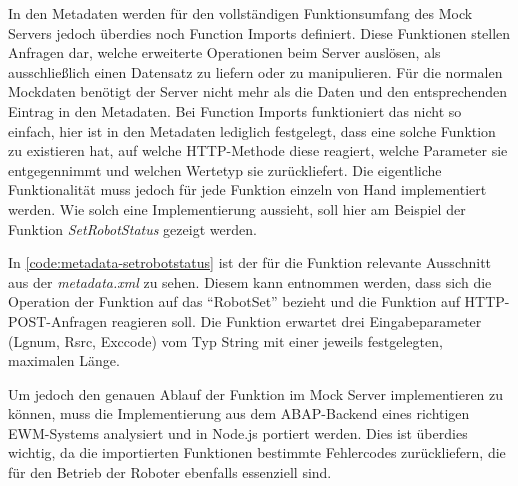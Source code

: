 In den Metadaten werden für den vollständigen Funktionsumfang des Mock Servers jedoch überdies noch Function Imports definiert.
Diese Funktionen stellen Anfragen dar, welche erweiterte Operationen beim Server auslösen, als ausschließlich einen Datensatz zu liefern oder zu manipulieren.
Für die normalen Mockdaten benötigt der Server nicht mehr als die Daten und den entsprechenden Eintrag in den Metadaten.
Bei Function Imports funktioniert das nicht so einfach, hier ist in den Metadaten lediglich festgelegt, dass eine solche Funktion zu existieren hat, auf welche \ac{HTTP}-Methode diese reagiert, welche Parameter sie entgegennimmt und welchen Wertetyp sie zurückliefert.
Die eigentliche Funktionalität muss jedoch für jede Funktion einzeln von Hand implementiert werden.
Wie solch eine Implementierung aussieht, soll hier am Beispiel der Funktion \emph{SetRobotStatus} gezeigt werden.



In \autoref{code:metadata-setrobotstatus} ist der für die Funktion relevante Ausschnitt aus der \emph{metadata.xml} zu sehen.
Diesem kann entnommen werden, dass sich die Operation der Funktion auf das \enquote{RobotSet} bezieht und die Funktion auf \ac{HTTP}-POST-Anfragen reagieren soll.
Die Funktion erwartet drei Eingabeparameter (Lgnum, Rsrc, Exccode) vom Typ String mit einer jeweils festgelegten, maximalen Länge.

Um jedoch den genauen Ablauf der Funktion im Mock Server implementieren zu können, muss die Implementierung aus dem ABAP-Backend eines richtigen \ac{EWM}-Systems analysiert und in Node.js portiert werden.
Dies ist überdies wichtig, da die importierten Funktionen bestimmte Fehlercodes zurückliefern, die für den Betrieb der Roboter ebenfalls essenziell sind.

